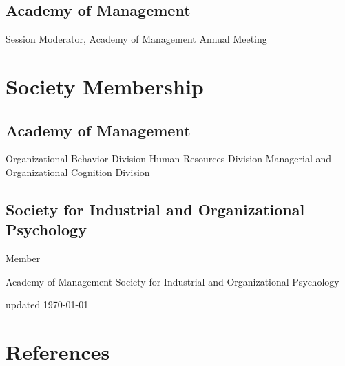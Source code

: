 \subsection*{Academy of Management}

\begin{entries}
    Session Moderator, Academy of Management Annual Meeting
\end{entries}


\section*{Society Membership}

\ifcvmedium
\subsection*{Academy of Management}

\begin{entries}
    \entn{}Organizational Behavior Division
    \entn{}Human Resources Division
    \entn{}Managerial and Organizational Cognition Division
\end{entries}

\subsection*{Society for Industrial and Organizational Psychology}

\begin{entries}
    \entn{}Member
\end{entries}
\else
\begin{entries}
    \entn{}Academy of Management
    \entn{}Society for Industrial and Organizational Psychology
\end{entries}
\fi


\vfill
\begin{center}
    \footnotesize updated \monthyeardate\today
\end{center}

\ifcvextended
\newpage
\thispagestyle{empty}

\section*{References}

